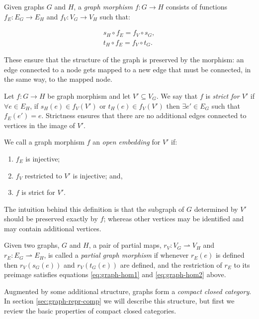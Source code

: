 \documentclass[runningheads]{llncs}
\begin{document}
Given graphs $G$ and $H$, a \emph{graph morphism} $f : G\to H$
consists of functions $f_E : E_G \to E_H$ and $f_V:V_G\to V_H$ such
that:

\begin{gather}
  s_H\circ f_E = f_V \circ s_G,\label{eq:graph-hom1}\\
  t_H\circ f_E = f_V \circ t_G\label{eq:graph-hom2}.
\end{gather}

\noindent These ensure that the structure of the graph is preserved by
the morphism: an edge connected to a node gets mapped to a new edge
that must be connected, in the same way, to the mapped node.

Let $f: G \to H$ be graph morphism and let $V' \subseteq V_G$. We say
that $f$ is \emph{strict for $V'$} if $\forall e \in E_H$, if $s_H(e)
\in f_V(V')$ or $t_H(e) \in f_V(V')$ then $\exists e' \in E_G$ such
that $f_E(e') = e$. Strictness ensures that there are no additional
edges connected to vertices in the image of $V'$.

\begin{definition}
\label{open-embedding-def}
We call a graph morphism $f$ an \emph{open embedding} for $V'$ if:
\begin{enumerate}
\item $f_E$ is injective;
\item $f_V$ restricted to $V'$ is injective; and,
\item $f$ is strict for $V'$.
\end{enumerate}
\end{definition}

\noindent The intuition behind this definition is that the subgraph of
$G$ determined by $V'$ should be preserved exactly by $f$; 
whereas other vertices may be identified and may contain additional
vertices.

Given two graphs, $G$ and $H$, a pair of partial maps, $r_V: V_G
\rightharpoonup V_H$ and $r_E: E_G \rightharpoonup E_H$, is called a
\emph{partial graph morphism} if whenever $r_E(e)$ is defined then
$r_V(s_G(e))$ and $r_V(t_G(e))$ are defined, and the restriction of
$r_E$ to its preimage satisfies equations \eqref{eq:graph-hom1} and
\eqref{eq:graph-hom2} above.

Augmented by some additional structure, graphs form a \emph{compact closed
category}.  In section \ref{sec:graph-repr-comp} we will describe this
structure, but first we review the basic properties of compact closed
categories.
\end{document}
